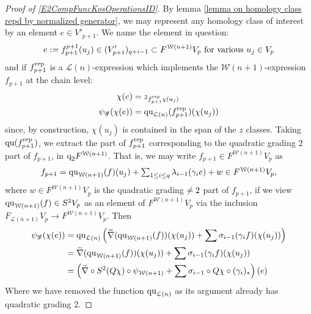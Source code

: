 \documentclass[11pt]{amsart}
\theoremstyle{plain}
\theoremstyle{definition}
\renewcommand{\to}{\longrightarrow}
\newcommand{\scrG}{\mathscr{G}}
\newcommand{\calL}{\mathcal{L}}
\newcommand{\calw}{\mathcal{W}}
\theoremstyle{plain}
\newcommand{\BSW}{{\scrG}}
\newcommand{\quadratic}{\textup{qu}}
\newcommand{\quadgrad}[1]{\textup{q}_{#1}}
\begin{document}
\begin{Operations in composite functor spectral sequences}
\begin{proof}[Proof of \ref{E2CompFuncKosOperationsID}]
By lemma \ref{lemma on homology class repd by normalized generator}, we may represent any homology class of interest by an element $e\in V'_{p+1}$. We name the element in question:
\[e:=f^{p+1}_{p+1}(u_j)\in (V'_{p+1})_{q+i-1}\subset F^{\calw(n+1)}V_p\textup{ for various }u_j\in V_{p}\]
and if $f_{p+1}^\textup{rep}$ is a $\calL(n)$-expression which implements the $\calw(n+1)$-expression $f_{p+1}$ at the chain level:
\begin{alignat*}{2}
\chi(e)&=z_{f_{p+1}^\textup{rep}\chi(u_j)}\\
\psi_{\BSW}(\chi(e))&=\quadratic_{\calL(n)}(f_{p+1}^\textup{rep})(\chi(u_j))
\end{alignat*}
since, by construction, $\chi(u_j)$ is contained in the span of the $z$ classes.  Taking $\quadratic(f_{p+1}^\textup{rep})$, we extract the part of $f_{p+1}^\textup{rep}$ corresponding to the quadratic grading 2 part of $f_{p+1}$, in $\quadgrad{2}F^{\calw(n+1)}$. That is, we may write $f_{p+1}\in F^{\calw(n+1)}V_p$ as
\[f_{p+1}=\quadratic_{\calw(n+1)}(f)(u_j)+\textstyle\sum_{1\leq i\leq q} \lambda_{i-1}(\gamma_ie) + w\in F^{\calw(n+1)}V_p,\]
where $w\in F^{\calw(n+1)}V_p$ is the quadratic grading$\makebox[0cm][l]{}\neq2$ part of $f_{p+1}$, if we view $\quadratic_{\calw(n+1)}(f)\in S^2V_p$ as an element of $F^{\calw(n+1)}V_p$ via the inclusion $F_{\calL(n+1)}V_p\to F^{\calw(n+1)}V_p$. Then
\begin{alignat*}{2}
\psi_\BSW(\chi(e))&=\quadratic_{\calL(n)} \left(\widetilde{\nabla}(\quadratic_{\calw(n+1)}(f))(\chi(u_j))+\sum \sigma_{i-1}(\gamma_if)(\chi(u_j))\right)\\
&=\widetilde{\nabla}(\quadratic_{\calw(n+1)}(f))(\chi(u_j))+\sum \sigma_{i-1}(\gamma_if)(\chi(u_j))\\
&=\left(\widetilde{\nabla}\circ S^2(Q\chi)\circ \psi_{\calw(n+1)}+\sum\sigma_{i-1}\circ Q\chi\circ(\gamma_i)_*\right)(e)
\end{alignat*}
Where we have removed the function $\quadratic_{\calL(n)}$ as its argument already has quadratic grading 2.
\end{proof}


\end{Operations in composite functor spectral sequences}
\end{document}
